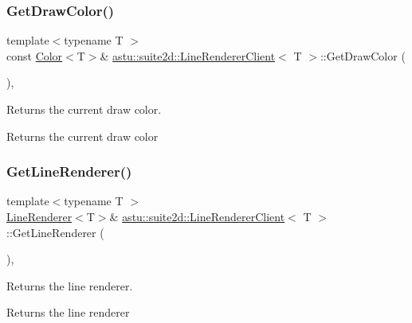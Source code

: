 \subsubsection{\texorpdfstring{Get\+Draw\+Color()}{GetDrawColor()}}
{\footnotesize\ttfamily template$<$typename T $>$ \\
const \hyperlink{classastu_1_1Color}{Color}$<$T$>$\& \hyperlink{classastu_1_1suite2d_1_1LineRendererClient}{astu\+::suite2d\+::\+Line\+Renderer\+Client}$<$ T $>$\+::Get\+Draw\+Color (\begin{DoxyParamCaption}{ }\end{DoxyParamCaption})\hspace{0.3cm}{\ttfamily [inline]}, {\ttfamily [protected]}}

Returns the current draw color.

\begin{DoxyReturn}{Returns}
the current draw color 
\end{DoxyReturn}
\mbox{\label{classastu_1_1suite2d_1_1LineRendererClient_a54c67e38264a5bcad98953f97037e6ce}} 
\subsubsection{\texorpdfstring{Get\+Line\+Renderer()}{GetLineRenderer()}}
{\footnotesize\ttfamily template$<$typename T $>$ \\
\hyperlink{classastu_1_1suite2d_1_1LineRenderer}{Line\+Renderer}$<$T$>$\& \hyperlink{classastu_1_1suite2d_1_1LineRendererClient}{astu\+::suite2d\+::\+Line\+Renderer\+Client}$<$ T $>$\+::Get\+Line\+Renderer (\begin{DoxyParamCaption}{ }\end{DoxyParamCaption})\hspace{0.3cm}{\ttfamily [inline]}, {\ttfamily [protected]}}

Returns the line renderer.

\begin{DoxyReturn}{Returns}
the line renderer 
\end{DoxyReturn}
\mbox{\label{classastu_1_1suite2d_1_1LineRendererClient_a55152a0ad8132995d930bb57429b05d3}} 
